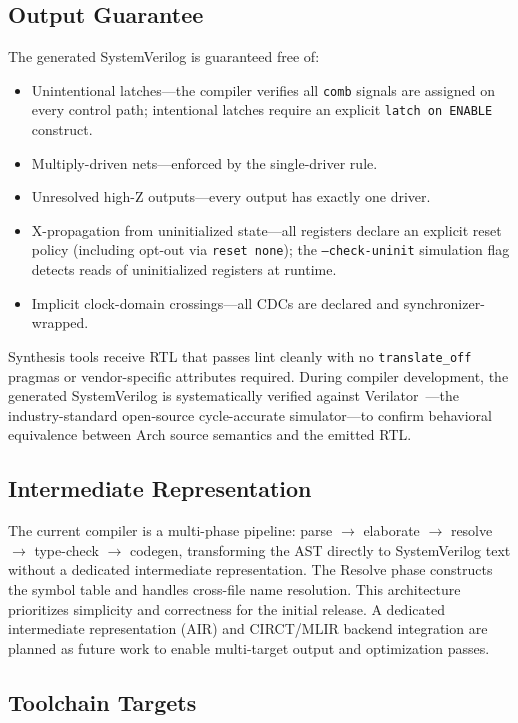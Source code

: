 \documentclass[11pt,twocolumn]{article}
\begin{document}
\subsection{Output Guarantee}

The generated SystemVerilog is guaranteed free of:
\begin{itemize}
\item Unintentional latches---the compiler verifies all \texttt{comb} signals are assigned on every control path; intentional latches require an explicit \texttt{latch on ENABLE} construct.
\item Multiply-driven nets---enforced by the single-driver rule.
\item Unresolved high-Z outputs---every output has exactly one driver.
\item X-propagation from uninitialized state---all registers declare an explicit reset policy (including opt-out via \texttt{reset none}); the \texttt{--check-uninit} simulation flag detects reads of uninitialized registers at runtime.
\item Implicit clock-domain crossings---all CDCs are declared and synchronizer-wrapped.
\end{itemize}

Synthesis tools receive RTL that passes lint cleanly with no \texttt{translate\_off} pragmas or vendor-specific attributes required. During compiler development, the generated SystemVerilog is systematically verified against Verilator~\cite{verilator}---the industry-standard open-source cycle-accurate simulator---to confirm behavioral equivalence between Arch source semantics and the emitted RTL.

\subsection{Intermediate Representation}

The current compiler is a multi-phase pipeline: parse $\to$ elaborate $\to$ resolve $\to$ type-check $\to$ codegen, transforming the AST directly to SystemVerilog text without a dedicated intermediate representation. The Resolve phase constructs the symbol table and handles cross-file name resolution. This architecture prioritizes simplicity and correctness for the initial release. A dedicated intermediate representation (AIR) and CIRCT/MLIR backend integration are planned as future work to enable multi-target output and optimization passes.

\subsection{Toolchain Targets}
\end{document}
